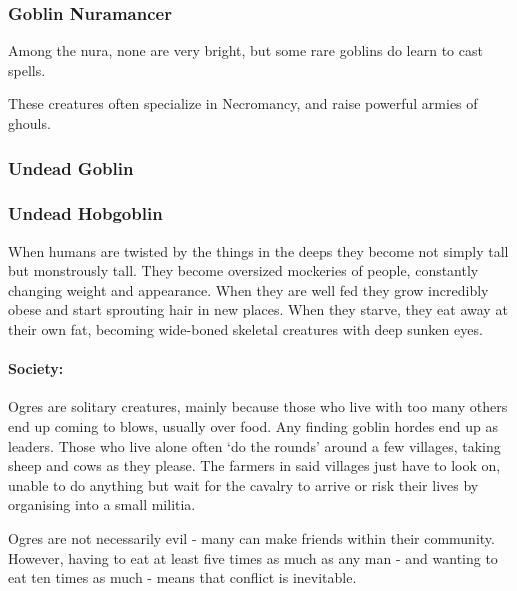 \begin{multicols}{2}
\deepgoblin

\subsubsection{Goblin Nuramancer}
Among the nura, none are very bright, but some rare goblins do learn to cast spells.

These creatures often specialize in Necromancy, and raise powerful armies of ghouls.

\goblinnuramancer

\subsubsection{Undead Goblin}

\undeadgoblin

\subsubsection{Undead Hobgoblin}

\undeadhobgoblin

\vfill\null
\label{ogre}
\ogre


When humans are twisted by the things in the deeps they become not simply tall but monstrously tall.  They become oversized mockeries of people, constantly changing weight and appearance.  When they are well fed they grow incredibly obese and start sprouting hair in new places.  When they starve, they eat away at their own fat, becoming wide-boned skeletal creatures with deep sunken eyes.

\paragraph{Society:} Ogres are solitary creatures, mainly because those who live with too many others end up coming to blows, usually over food.  Any finding goblin hordes end up as leaders.  Those who live alone often `do the rounds' around a few villages, taking sheep and cows as they please.  The farmers in said villages just have to look on, unable to do anything but wait for the cavalry to arrive or risk their lives by organising into a small militia.

	Ogres are not necessarily evil - many can make friends within their community.  However, having to eat at least five times as much as any man - and wanting to eat ten times as much - means that conflict is inevitable.

\end{multicols}

